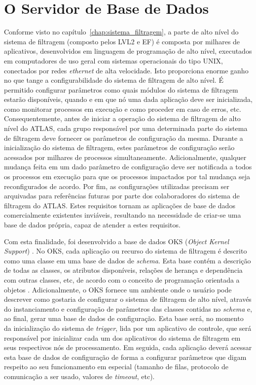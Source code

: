 \section{O Servidor de Base de Dados}
\label{sec:oks}

Conforme visto no capítulo~\ref{chap:sistema_filtragem}, a parte de alto nível do sistema de filtragem (composto pelos LVL2 e EF) é composta por milhares de aplicativos, desenvolvidos em linguagem de programação de alto nível, executados em computadores de uso geral com sistemas operacionais do tipo UNIX, conectados por redes \emph{ethernet} de alta velocidade. Isto proporciona enorme ganho no que tange a configurabilidade do sistema de filtragem de alto nível. É permitido configurar parâmetros como quais módulos do sistema de filtragem estarão disponíveis, quando e em que nó uma dada aplicação deve ser inicializada, como monitorar processos em execução e como proceder em caso de erros, etc. Consequentemente, antes de iniciar a operação do sistema de filtragem de alto nível do ATLAS, cada grupo responsável por uma determinada parte do sistema de filtragem deve fornecer os parâmetros de configuração da mesma. Durante a inicialização do sistema de filtragem, estes parâmetros de configuração serão acessados por milhares de processos simultaneamente. Adicionalmente, qualquer mudança feita em um dado parâmetro de configuração deve ser notificada a todos os processos em execução para que os processos impactados por tal mudança seja reconfigurados de acordo. Por fim, as configurações utilizadas precisam ser arquivadas para referências futuras por parte dos colaboradores do sistema de filtragem do ATLAS. Estes requisitos  tornam as aplicações de base de dados comercialmente existentes inviáveis, resultando na necessidade de criar-se uma base de dados própria, capaz de atender a estes requisitos. 

Com esta finalidade, foi desenvolvido a base de dados OKS (\emph{Object Kernel Support}) \cite{bib:oks}. No OKS, cada aplicação ou recurso do sistema de filtragem é descrito como uma classe em uma base de dados de \emph{schema}. Esta base contém a descrição de todas as classes, os atributos disponíveis, relações de herança e dependência com outras classes, etc, de acordo com o conceito de programação orientada a objetos \cite{bib:poo}. Adicionalmente, o OKS fornece um ambiente onde o usuário pode descrever como gostaria de configurar o sistema de filtragem de alto nível, através do instanciamento e configuração de parâmetros das classes contidas no \emph{schema} e, ao final, gerar uma base de dados de configuração. Esta base será, no momento da inicialização do sistema de \emph{trigger}, lida por um aplicativo de controle, que será responsável por inicializar cada um dos aplicativos do sistema de filtragem em seus respectivos nós de processamento. Em seguida, cada aplicação deverá acessar esta base de dados de configuração de forma a configurar parâmetros que digam respeito ao seu funcionamento em especial (tamanho de filas, protocolo de comunicação a ser usado, valores de \emph{timeout}, etc).  

